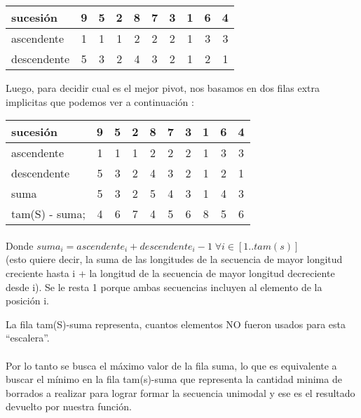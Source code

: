 \begin{center}
   \begin{tabular}{| l | c | c |c |c |c |c |c |c |c | }
     \hline
     sucesión & 9 & 5 & 2 & 8 & 7 & 3 & 1 & 6 & 4 \\ \hline
     ascendente & 1& 1& 1& 2& 2& 2& 1 &3 & 3 \\ \hline
     descendente & 5& 3& 2& 4& 3& 2& 1 &2 & 1 \\ \hline
          \hline
   \end{tabular}
 \end{center}

Luego, para decidir cual es el mejor pivot, nos basamos en dos filas extra implicitas que podemos ver a continuación :

\begin{center}
   \begin{tabular}{| l | c | c |c |c |c |c |c |c |c | }
     \hline
     sucesión 		& 9& 5& 2& 8& 7& 3& 1 &6 & 4 \\ \hline
     ascendente 	& 1& 1& 1& 2& 2& 2& 1 &3 & 3 \\ \hline
     descendente 	& 5& 3& 2& 4& 3& 2& 1 &2 & 1 \\ \hline
     suma	 	& 5& 3& 2& 5& 4& 3& 1 &4 & 3 \\ \hline
     tam(S) - suma;	& 4& 6& 7& 4& 5& 6& 8 &5 & 6 \\ \hline
     
          \hline
   \end{tabular}
 \end{center}


\paragraph{}
Donde $suma_i = ascendente_i + descendente_i - 1 \; \forall i \in [ 1..tam(s)]$ \\(esto quiere decir, la suma de las longitudes de la secuencia de mayor longitud creciente hasta i + la longitud de la secuencia de mayor longitud decreciente desde i). Se le resta 1 porque ambas secuencias incluyen al elemento de la posición i.

La fila tam(S)-suma representa, cuantos elementos NO fueron usados para esta ``escalera''. 


\paragraph{}
Por lo tanto se busca el máximo valor de la fila suma, lo que es equivalente a buscar el mínimo en la fila tam(s)-suma que representa la cantidad minima de borrados a realizar para lograr formar la secuencia unimodal y ese es el resultado devuelto por nuestra función.




